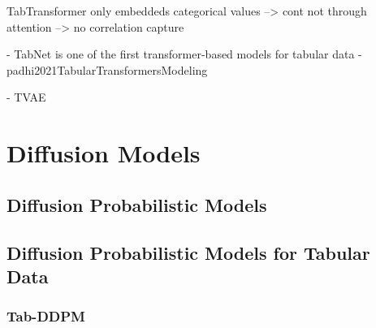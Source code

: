 TabTransformer only embeddeds categorical values --> cont not through attention --> no correlation capture \cite{somepalli2021SAINTImprovedNeural}

- TabNet is one of the first transformer-based models for tabular data \cite{borisov2022DeepNeuralNetworks}
- padhi2021TabularTransformersModeling


- TVAE

\section{Diffusion Models}
\label{ch:relatedWork-diffusionModels}

\subsection{Diffusion Probabilistic Models}
\label{ch:preliminaries-diffusionProbabilisticModelsTabularData}


\subsection{Diffusion Probabilistic Models for Tabular Data}
\label{ch:preliminaries-generativeAlgorithms-diffusionProbabilisticModelsTabularData}


\subsubsection{Tab-DDPM}
\label{ch:relatedWork-diffusionModels-tabDDPM}



